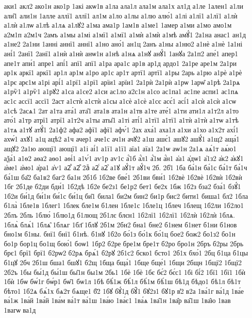 {аки1
акл2
ако1н
ако1р
1акі
акѡ1в
а1ла
ала1л
ала1м
ала1х
ал1д
а1ле
1ален1
а1ли
али̑1
али1н
1алле
аллї1
аллї1
ал1м
а1ло
а1лы
а1лю
алю́1
а1лі
а1лї1
а1лї1
а1лѝ
а1лѝ
а1лѡ
а1лѣ
а1лѧ
а1лꙋ2
а1ма
ама1р
1ам1в
а1ме1
1амер
а1ми
а1мо
амо1м
а2м1п
а2м1ч
2амъ
а1мы
а1мі
а1мї1
а1мї1
а1мѝ
а1мѝ
а1мѣ
амꙋ́1
2а1на
анас1
ан1д
а1не2
2а1ни
1анні
аннї1
аннї1
а1но
ано́1
ан1ц
2анъ
а1ны
а1ню2
а1нѐ
а1нѐ
1а1ні
ані́1
2анї1
2анї1
а1нѝ
а1нѝ
анѡ1н
а1нѣ
а1нѧ
а1нꙋ
анꙋ́1
1анꙋа
2а1п2
апе́1
апер1
апе1т
апи́1
апре1
апі́1
апї1
апї1
а1ра
ара1с
ар1в
ар1д
ардо1
2а1ре
аре1м
2а1ри
ар1к
аркї1
аркї1
ар1л
ар1м
а1ро
ар1с
ар1т
артї1
артї1
а1ры
2арь
а1рю
а1рѐ
а1рѐ
а1рє
арє1м
а1рі
арі́1
а1рї1
а1рї1
арїи1
арїи1
2а1рѝ
2а1рѝ
а1рѡ
1арѡ̑
а1рѣ
2а1рѧ
а1рѷ1
а1рѷ1
а1рꙋ2
а1са
а1се2
а1си
ас1ло
а2с1н
а1со
ас1па1
ас1пе
аспи1
ас1пѧ
ас1с
ассї1
ассї1
2аст
а1стѝ
а1стѝ
а1сы
а1сѐ
а1сѐ
а1сє
асє́1
асі́1
а1сѝ
а1сѝ
а1сѡ
а1сѣ
2асѧ1
2ат
а1та
ата́1
ата̑1
ата1в
ата1н
а1тв
а1те
ате́1
а1ти
ати1л
а1т2л
а1то
ато́1
а1тр
атрї1
атрї1
а1т2ч
а1ты
аты̑1
а1ті
аті́1
а1тї1
а1тї1
а1тѝ
а1тѝ
а1тѡ
а1тѣ
а1тѧ
а1тꙋ
атꙋ́1
2а1ф2
афа2
афї1
афї1
афѵ́1
2ах
аха́1
аха1л
а1хи
а1хо
а1х2т
ахі́1
ахѡ́1
ахꙋ1
а1ц
ацѣ2
а1ч
ачер1
аче1с
ач1н
ачꙋ2
а1ш
ашє́1
ашꙋ2
ашꙋ́1
а1щ2
аща́1
ащꙋ2
2а1ю
ающї1
ающї1
а1і
аі́1
а1ї1
а1ї1
аїа1
аїа1
2а1ѡ
аѡ1н
2а1ѧ
аѧ́1т
аѧ́ю1
аѯа́1
а1ѳ2
аѳа2
аѳо1
аѳі́1
а1ѵ́1
аѵ1р
аѵ1с
а҆́1б
а҆́л1
а҆́1м
а҆́н1
а҆а1
а҆дѡ1
а҆1з2
а҆к2
а҆кꙋ1
а҆ме1
а҆мо1
а҆ра1
а҆ѵ1
а2ⷡ
а2ⷤ
2аⷩ
а2ⷭ
а2ⷱ
а1ꙋ
аꙋ́1т
аꙋ́1ч
2б.
2б̾1
1ба
ба́1н
ба́1с
ба́1т
ба́1ч
ба́1ш
ба̑2
ба1в2
баг2
ба1н
2б1б
1б2ве
бве́1
2б1ви
бви́1
1б2вѐ
1б2вѐ
1б2вѝ
1б2вѝ
1бг
2б1де
б2ди
бди́1
1б2дѣ
1б2е
бе2з1
бе1р2
бет1
бе2х
1бж
1б2з
бза2
бза́1
бзꙋ́1
1б2и
би́1д
би́1н
би́1с
би́1ц
би̑1
била1
би2м
бин2
би1р
бис2
бити1
биша1
бл2
1бла
б1ла̀
1бле1в
1блег1
1блек
бле1м
б1лен
1бле1с
1бле1ц
1блеч
1блещ
1б2ли
1б2ло1
2блъ
2бль
1блю́
1блю1д
б1лющ
2б1лє
блєн1
1б2лї1
1б2лї1
1б2лѝ
1б2лѝ
1блѧ.
1блѧ̀
блѧ́1
1блѧ̑
1блѧг
1бл҃
1блꙋ
2б1м
2бн2
бна1
бне2
б1нем
б1нет
б1ни
б1нов
бно1м
б1ны.
бнї1
бнї1
б1нѣ.
б1нꙋ
1б2о
бо́1з
бо́1к
бо́1ц
бое2
бож2
бо1з2
бо1н
бо1р
бор1ц
бо1щ
бою́1
боѡ1
1бр2
б2ре
бре1м
бре1т
б2ро
бро1н
2бръ
б2ры
2брь
брє1
брї1
брї1
б2рѡ2
б2рѧ
брѧ́1
б2рꙋ
2б1с2
бско1
бсто1
2б1х
бхо́1
2бц
б1ца
б1цы
б1цꙋ
2бч
2б1ш
бша1
бшꙋ1
б2щ
1бща
бща́1
1бще
бще́1
1бщи
2бщн
1бщї2
1бщї2
2б2ъ
1бы
бы́1д
бы́1ш
бы̑1н
бы1м
2бь1
1бѐ
1бѐ
1бє
бє́2
бє́с1
1бі
бі́2
1бї1
1бї1
1бѝ
1бѝ
1бѡ
бѡ́1г
бѡ́р1
бѡ̑1
бѡ1л
1бѣ
бѣ́1ж
бѣ́1л
бѣ́1м
бѣ́1ш
бѣ1д
бѣдо1
бѣ1л
бѣ1т
бѣто1
1б2ѧ
бѧ́1х
бѧ2т
бѧще1
б҃2
1бꙋ
бꙋ́1д
бꙋ̑1
бꙋ2з1
бꙋ1р
в̾2
в2а
1ва́1г
ва́1д
1ва́е
ва́1ж
1ва́й
1ва́й
1ва́м
ва́1т
ва́1ш
1ва́ю
1ва́є1
1ва́ѧ
1ва̑1н
1ва̑р
ва̑1ш
1ва̑ю
1вав
1вагѡ
ва1д
}

